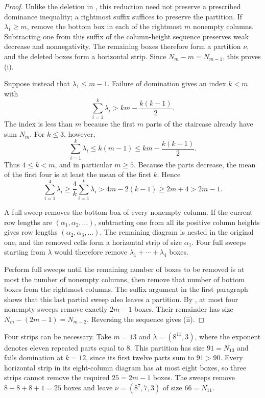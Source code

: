 \begin{proof}
Unlike the deletion in , this reduction need not
preserve a prescribed dominance inequality; a rightmost suffix suffices
to preserve the partition.
If $\lambda_1\ge m$, remove the bottom box in each of the rightmost $m$
nonempty columns. Subtracting one from this suffix of the column-height
sequence preserves weak decrease and nonnegativity. The remaining boxes
therefore form a partition $\nu$, and the deleted boxes form a horizontal
strip. Since $N_m-m=N_{m-1}$, this proves \textup{(i)}.

Suppose instead that $\lambda_1\le m-1$. Failure of domination gives an
index $k<m$ with
\begin{equation}
\label{comb:dominance-failure}
\sum_{i=1}^k\lambda_i>km-\frac{k(k-1)}2.
\end{equation}
The index is less than $m$ because the first $m$ parts of the staircase
already have sum $N_m$. For $k\le3$, however,
\[
\sum_{i=1}^k\lambda_i\le k(m-1)
\le km-\frac{k(k-1)}2.
\]
Thus $4\le k<m$, and in particular $m\ge5$. Because the parts decrease,
the mean of the first four is at least the mean of the first $k$. Hence
\begin{equation}
\label{comb:four-row-capacity}
\sum_{i=1}^4\lambda_i
\ge\frac4k\sum_{i=1}^k\lambda_i
>4m-2(k-1)\ge2m+4>2m-1.
\end{equation}

A full sweep removes the bottom box of every nonempty column. If the
current row lengths are $(\alpha_1,\alpha_2,\ldots)$, subtracting one from
all its positive column heights gives row lengths
$(\alpha_2,\alpha_3,\ldots)$. The remaining diagram is nested in the
original one, and the removed cells form a horizontal strip of size
$\alpha_1$. Four full sweeps starting from $\lambda$ would therefore
remove $\lambda_1+\cdots+\lambda_4$ boxes.

Perform full sweeps until the remaining number of boxes to be removed is
at most the number of nonempty columns, then remove that number of bottom
boxes from the rightmost columns. The suffix argument in the first
paragraph shows that this last partial sweep also leaves a partition.
By , at most four nonempty sweeps remove
exactly $2m-1$ boxes. Their remainder has size
$N_m-(2m-1)=N_{m-2}$. Reversing the sequence gives \textup{(ii)}.
\end{proof}

Four strips can be necessary. Take $m=13$ and $\lambda=(8^{11},3)$,
where the exponent denotes eleven repeated parts equal to $8$.
This partition has size $91=N_{13}$ and fails domination at $k=12$,
since its first twelve parts sum to $91>90$.
Every horizontal strip in its eight-column diagram has at most eight
boxes, so three strips cannot remove the required $25=2m-1$ boxes.
The sweeps remove $8+8+8+1=25$ boxes and leave
$\nu=(8^7,7,3)$ of size $66=N_{11}$.

